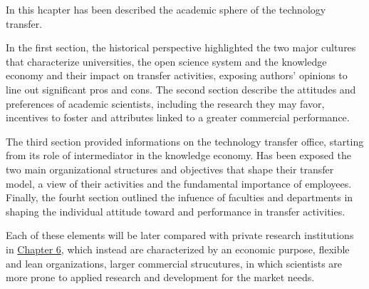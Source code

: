 In this hcapter has been described the academic sphere of the technology transfer. 

In the first section, the historical perspective highlighted the two major cultures that characterize universities, the open science system and the knowledge economy and their impact on transfer activities, exposing authors' opinions to line out significant pros and cons. The second section describe the attitudes and preferences of academic scientists, including the research they may favor, incentives to foster and attributes linked to a greater commercial performance. 

The third section provided informations on the technology transfer office, starting from its role of intermediator in the knowledge economy. Has been exposed the two main organizational structures and objectives that shape their transfer model, a view of their activities and the fundamental importance of employees. Finally, the fourht section outlined the infuence of faculties and departments in shaping the individual attitude toward and performance in transfer activities.

Each of these elements will be later compared with private research institutions in \hyperref[Chapter6]{Chapter 6}, which instead are characterized by an economic purpose, flexible and lean organizations, larger commercial strucutures, in which scientists are more prone to applied research and development for the market needs.